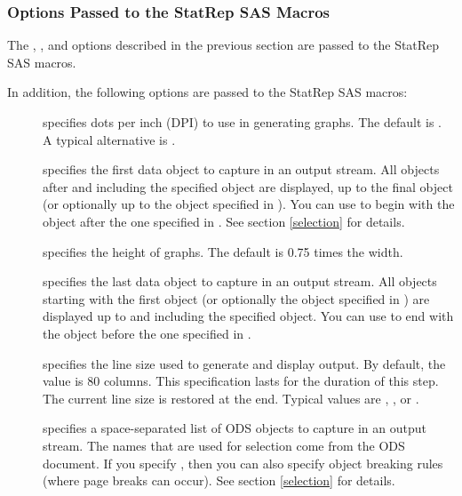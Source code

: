 \documentclass[article,oneside]{memoir}
\newcommand*{\StatRep}{\textsf{StatRep}\xspace}
\begin{document}
  \subsubsection{Options Passed to the  \textsf{StatRep} SAS Macros}\label{sasopts}

The , , and  options described in the previous
section are passed to the \StatRep SAS macros.

In addition, the following options are passed to the \StatRep SAS macros:
  \begin{description}
    \item[] specifies dots per inch (DPI) to use in generating graphs.
  The default is . A typical alternative is .

  \item[] specifies the first data object to capture in an output stream.
  All objects after and including the specified object
  are displayed, up to the final object
 (or optionally up to the object specified in ).
  You can use  to begin with the object after the one specified in .
  See section \ref{selection} for details.

  \item[] specifies the height of graphs. The default is 0.75 times the width.

  \item[] specifies the last data object to capture in an output stream.
  All objects starting with the first object
  (or optionally the object specified in ) are displayed up to and
  including the specified object.
  You can use  to end with the object before the one specified in .

\item[] specifies the line size used to generate and display
      output. By default, the value is 80 columns.
     This specification lasts for the duration of this step. The current line size is
     restored at the end.
     Typical values are , , or .

  \item[] specifies a space-separated list of ODS objects to capture
  in an output stream.
  The names that are used for selection come from the ODS document.
  If you specify , then you can also specify object breaking rules
  (where page breaks can occur). See section \ref{selection} for details.


\end{description}
\end{document}
